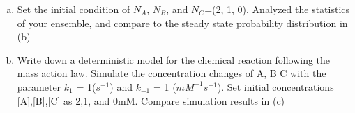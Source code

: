 \documentclass[paper=a4, fontsize=11pt]{scrartcl} %
\numberwithin{equation}{section} %
\numberwithin{figure}{section} %
\numberwithin{table}{section} %
\begin{document}
\begin{enumerate}[a)]
		\item Set the initial condition of $N_A$, $N_B$, and $N_C$=(2, 1, 0). Analyzed the statistics of your ensemble, and compare to the steady state probability distribution in (b)

		\item Write down a deterministic model for the chemical reaction following the mass action law. Simulate the concentration changes of A, B C with the parameter $k_1$ = 1($s^{-1}$) and $k_{-1}$ = 1 ($mM^{-1}s^{-1}$). Set initial concentrations [A],[B],[C] as 2,1, and 0mM. Compare simulation results in (c)
	\end{enumerate}
\end{document}
